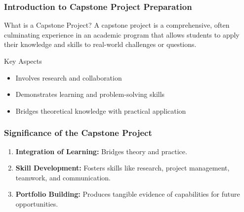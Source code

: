 \documentclass[aspectratio=169]{beamer}
\begin{document}
\frame{\titlepage}

\begin{frame}[fragile]
    \frametitle{Introduction to Capstone Project Preparation}
    \begin{block}{What is a Capstone Project?}
        A capstone project is a comprehensive, often culminating experience in an academic program that allows students to apply their knowledge and skills to real-world challenges or questions. 
    \end{block}
    
    \begin{block}{Key Aspects}
        \begin{itemize}
            \item Involves research and collaboration
            \item Demonstrates learning and problem-solving skills
            \item Bridges theoretical knowledge with practical application
        \end{itemize}
    \end{block}
\end{frame}

\begin{frame}[fragile]
    \frametitle{Significance of the Capstone Project}
    \begin{enumerate}
        \item \textbf{Integration of Learning:} Bridges theory and practice.
        \item \textbf{Skill Development:} Fosters skills like research, project management, teamwork, and communication.
        \item \textbf{Portfolio Building:} Produces tangible evidence of capabilities for future opportunities.
    \end{enumerate}
\end{frame}
\end{document}
